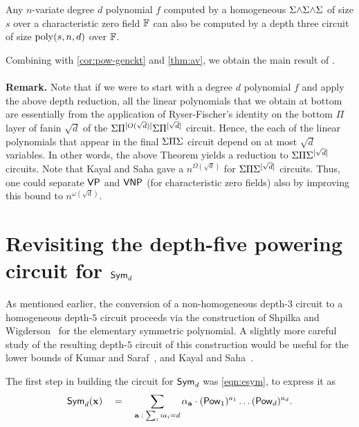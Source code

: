 \begin{lemma}
  Any $n$-variate degree $d$ polynomial $f$ computed by a homogeneous
  $\Sigma\mathord{\wedge}\Sigma\mathord{\wedge}\Sigma$ of size $s$ over a characteristic zero field $\mathbb{F}$ can also
  be computed by a depth three circuit of size $\mathrm{poly}(s,n,d)$ over
  $\mathbb{F}$. 
\end{lemma}

Combining with \autoref{cor:pow-genckt} and \autoref{thm:av}, we obtain the main result of \cite{gkks13b}. \\

\\

{\bf Remark. } Note that if we were to start with a degree $d$
polynomial $f$ and apply the above depth reduction, all the linear
polynomials that we obtain at bottom are essentially from the
application of Ryser-Fischer's identity on the bottom $\Pi$ layer of
fanin $\sqrt{d}$ of the $\Sigma\Pi^{[O(\sqrt{d})]}\Sigma\Pi^{[\sqrt{d}]}$ circuit.
Hence, the each of the linear polynomials that appear in the final
$\Sigma\Pi\Sigma$ circuit depend on at most $\sqrt{d}$ variables.
In other words, the above Theorem yields a reduction to
$\Sigma\Pi\Sigma^{[\sqrt{d}]}$ circuits.
Note that Kayal and Saha \cite{KayalSaha14} gave a
$n^{\Omega(\sqrt{d})}$ for $\Sigma\Pi\Sigma^{[\sqrt{d}]}$ circuits.
Thus, one could separate $\mathsf{VP}$ and $\mathsf{VNP}$ (for characteristic zero
fields) also by improving this bound to $n^{\omega(\sqrt{d})}$. 


\section{Revisiting the depth-five powering circuit for $\mathsf{Sym}_d$ }

As mentioned earlier, the conversion of a non-homogeneous depth-$3$
circuit to a homogeneous depth-$5$ circuit proceeds via the
construction of Shpilka and Wigderson~\cite{sw2001} for the elementary
symmetric polynomial.
A slightly more careful study of the resulting depth-$5$ circuit of
this construction would be useful for the lower bounds of Kumar and
Saraf~\cite{KumarSaraf15}, and Kayal and Saha~\cite{KayalSaha15}.

The first step in building the circuit for $\mathsf{Sym}_d$ was \eqref{eqn:esym}, to express it as
\[
\mathsf{Sym}_d(\mathbf{x}) \quad = \quad \sum_{\mathbf{a}\;:\; \sum_i ia_i = d} \alpha_{\mathbf{a}} \cdot (\mathsf{Pow}_1)^{a_1}\dots (\mathsf{Pow}_d)^{a_d}.
\]

